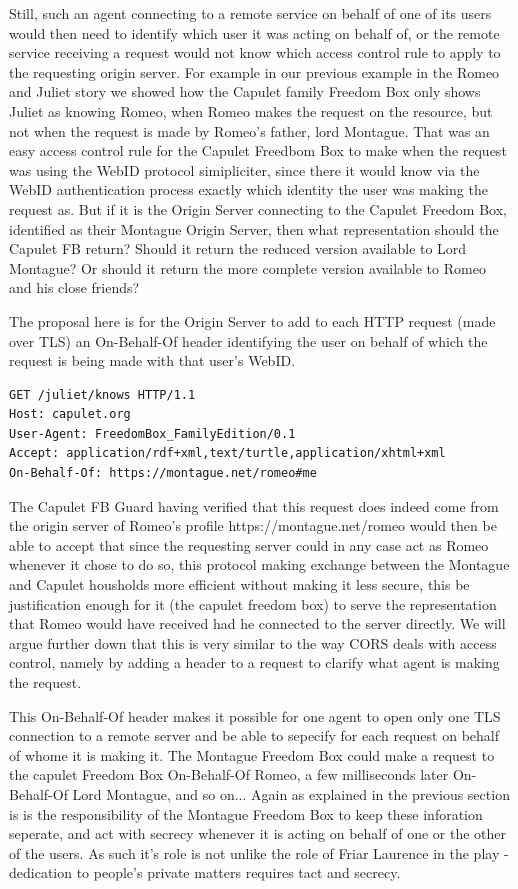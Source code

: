 \documentclass[a4paper]{llncs}
\begin{document}
Still, such an agent connecting to a remote service on behalf of one of its users would then need to identify which user it was acting on behalf of, or the remote service receiving a request would not know which access control rule to apply to the requesting origin server.
For example in our previous example in the Romeo and Juliet story we showed how the Capulet family Freedom Box only shows Juliet as knowing Romeo, when Romeo makes the request on the resource, but not when the request is made by Romeo's father, lord Montague.
That was an easy access control rule for the Capulet Freedbom Box to make when the request was using the WebID protocol simipliciter, since there it would know via the WebID authentication process exactly which identity the user was making the request as. 
But if it is the Origin Server connecting to the Capulet Freedom Box, identified as their Montague Origin Server, then what representation should the Capulet FB return? 
Should it return the reduced version available to Lord Montague?
Or should it return the more complete version available to Romeo and his close friends?

The proposal here is for the Origin Server to add to each HTTP request (made over TLS) an On-Behalf-Of header identifying the user on behalf of which the request is being made with that user's WebID.

\begin{verbatim}
GET /juliet/knows HTTP/1.1
Host: capulet.org
User-Agent: FreedomBox_FamilyEdition/0.1 
Accept: application/rdf+xml,text/turtle,application/xhtml+xml
On-Behalf-Of: https://montague.net/romeo#me
\end{verbatim}

The Capulet FB Guard having verified that this request does indeed come from the origin server of Romeo's profile
https://montague.net/romeo would then be able to accept that since the requesting server could in any case act as Romeo whenever it chose to do so, this protocol making exchange between the Montague and Capulet housholds more efficient without making it less secure, this be justification enough for it (the capulet freedom box) to  serve the representation that Romeo would have received had he connected to the server directly.  
We will argue further down that this is very similar to the way CORS deals with access control, namely by adding a header to a request to clarify what agent is making the request.

This On-Behalf-Of header makes it possible for one agent to open only one TLS connection to a remote server and be 
able to sepecify for each request on behalf of whome it is making it. The Montague Freedom Box could make a request to the capulet Freedom Box On-Behalf-Of Romeo, a few milliseconds later On-Behalf-Of Lord Montague, and so on... 
Again as explained in the previous section is is the responsibility of the Montague Freedom Box to keep these inforation seperate, and act with secrecy whenever it is acting on behalf of one or the other of the users. 
As such it's role is not unlike the role of Friar Laurence in the play - dedication to people's private matters requires tact and secrecy.
\end{document}
